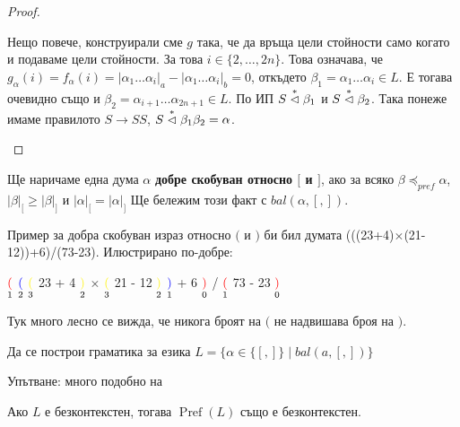 \begin{proof}
\begin{itemize}
\begin{itemize}
                      Нещо повече, конструирали сме $g$ така, че да връща цели стойности само когато и подаваме цели стойности.
                      За това $i \in \{ 2, \dots, 2n \}$.
                      Това означава, че $g_\alpha(i) = f_\alpha(i) = |\alpha_1 \dots \alpha_i|_a - |\alpha_1 \dots \alpha_i|_b = 0$, откъдето $\beta_1 = \alpha_1 \dots \alpha_i \in L$.
                      Е тогава очевидно също и $\beta_2 = \alpha_{i + 1} \dots \alpha_{2n + 1} \in L$.
                      По ИП $S \stackrel{*}{\vartriangleleft} \beta_1$ и $S \stackrel{*}{\vartriangleleft} \beta_2$.
                      Така понеже имаме правилото $S \rightarrow SS$, $S \stackrel{*}{\vartriangleleft} \beta_1 \beta_2 = \alpha$.
            \end{itemize}
    \end{itemize}
\end{proof}

\begin{definition}
    Ще наричаме една дума $\alpha$ \textbf{добре скобуван относно $[$ и $]$}, ако за всяко $\beta \preceq_{pref} \alpha$, $|\beta|_[ \geq |\beta|_]$ и $|\alpha|_[ = |\alpha|_]$
    Ще бележим този факт с $bal(\alpha, [, ])$.
\end{definition}

Пример за добра скобуван израз относно $($ и $)$ би бил думата (((23+4)$\times$(21-12))+6)/(73-23).
Илюстрирано по-добре:

\begin{center}
    $\underset{1}{\textcolor{red}{(}}$
    $\underset{2}{\textcolor{blue}{(}}$
    $\underset{3}{\textcolor{yellow}{(}}$
    23
    +
    4
    $\underset{2}{\textcolor{yellow}{)}}$
    $\times$
    $\underset{3}{\textcolor{yellow}{(}}$
    21
    -
    12
    $\underset{2}{\textcolor{yellow}{)}}$
    $\underset{1}{\textcolor{blue}{)}}$
    +
    6
    $\underset{0}{\textcolor{red}{)}}$
    /
    $\underset{1}{\textcolor{red}{(}}$
    73
    -
    23
    $\underset{0}{\textcolor{red}{)}}$
\end{center}

Тук много лесно се вижда, че никога броят на $($ не надвишава броя на $)$.

\begin{problem}
Да се построи граматика за езика $L = \{ \alpha \in \{ [, ] \} \mid bal(a, [, ]) \}$

Упътване: много подобно на 
\end{problem}

\pagebreak

\begin{claim}
    Ако $L$ е безконтекстен, тогава $\operatorname{Pref}(L)$ също е безконтекстен.
\end{claim}


